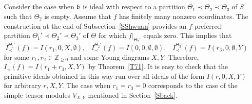 \documentclass[10pt]{amsart}\oddsidemargin -1mm \evensidemargin -1mm \topmargin -15mm\headheight5mm \headsep 3.5mm \textheight 245mm\textwidth 170mm
\theoremstyle{definition}\newtheorem{theorem}{Theorem}[section]\newtheorem{lemma}[theorem]{Lemma}\newtheorem{remark}[theorem]{Remark}\newtheorem{proposition}[theorem]{Proposition}\newtheorem{corollary}[theorem]{Corollary}\newtheorem{definition}[theorem]{Definition}\newtheorem{Ex}[theorem]{Example}\newtheorem{obs}[theorem]{Observation}\newtheorem{nota}[theorem]{Notation}
\begin{document}
\subsection{}
Consider the case when $\frak b$ is ideal with respect to a partition $\Theta_1\prec \Theta_2\prec \Theta_3$ of $S$ such that $\Theta_2$ is empty. 
Assume that $f$ has finitely many nonzero coordinates. 
The construction at the end of Subsection~\ref{SShwuan} provides an $f$-preferred partition $\Theta_1'\prec \Theta_2'\prec \Theta_3'$ of $\Theta$ for which $f|_{\Theta_2'}$ equals zero. 
This implies that
$$I_\prec^{\Theta_1'}(f)=I(r_1, 0, {X}, \emptyset),\hspace{10pt}I_\prec^{\Theta_2'}(f)=I(0, 0, \emptyset, \emptyset),\hspace{10pt}I_\prec^{\Theta_3'}(f)=I(r_3, 0, \emptyset, {Y})$$
for some $r_1, r_2\in\mathbb Z_{\ge0}$ and some Young diagrams ${X}, {Y}$. Therefore, $I_\prec(f)=I(r_1+r_3, {X}, {Y})$ by Theorem~\ref{T71}. 
It is easy to check that the primitive ideals obtained in this way run over all ideals of the form $I(r, 0, {X}, {Y})$ for arbitrary $r, {X}, {Y}$. 
The case when $r_1=r_3=0$ corresponds to the case of the simple tensor modules $V_{{X}, {Y}}$ mentioned in Section~\ref{Sback}.
\end{document}
